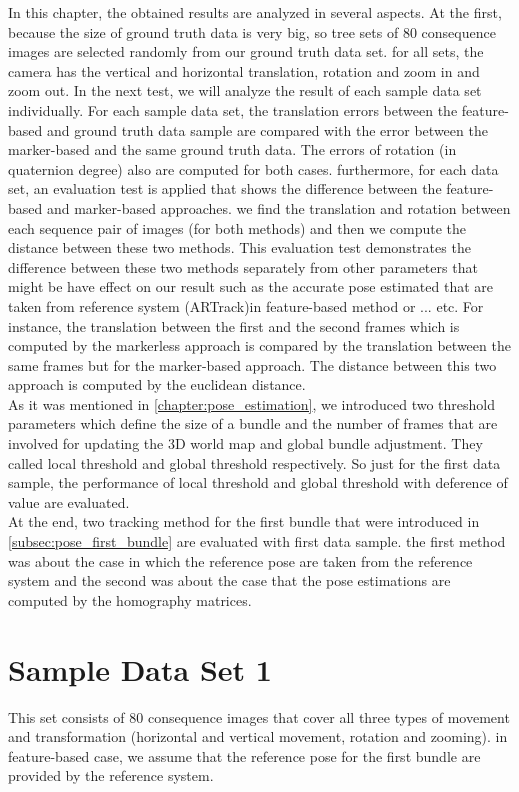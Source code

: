 In this chapter, the obtained results are analyzed in several aspects. At the first, because the size of ground truth data is very big, so tree sets of 80 consequence images are selected randomly from our ground truth data set. for all sets, the camera has the vertical and horizontal translation, rotation and zoom in and zoom out. In the next test, we will analyze the result of each sample data set individually. For each sample data set, the translation errors between the feature-based and ground truth data sample are compared with the error between the marker-based and the same ground truth data. The errors of rotation (in quaternion degree) also are computed for both cases. furthermore, for each data set, an evaluation test is applied that shows the difference between the feature-based and marker-based approaches. we find the translation and rotation between each sequence pair of images (for both methods) and then we compute the distance between these two methods. This evaluation test demonstrates the difference between these two methods separately from other parameters that might be have effect on our result such as the accurate pose estimated that are taken from reference system (ARTrack)in feature-based method or ... etc. For instance, the translation between the first and the second frames which is computed by the markerless approach is compared by the translation between the same frames but for the marker-based approach. The distance between this two approach is computed by the euclidean distance.\\
As it was mentioned in \autoref{chapter:pose_estimation}, we introduced two threshold parameters which define the size of a bundle and the number of frames that are involved for updating the 3D world map and global bundle adjustment. They called local threshold and global threshold respectively. So just for the first data sample, the performance of local threshold and global threshold with deference of value are evaluated.\\
At the end, two tracking method for the first bundle that were introduced in \autoref{subsec:pose_first_bundle} are evaluated with first data sample. the first method was about the case in which the reference pose are taken from the reference system and the second was about the case that the pose estimations are computed by the homography matrices.

\section{Sample Data Set 1} \label{sec:sample_01}
This set consists of 80 consequence images that cover all three types of movement and transformation (horizontal and vertical movement, rotation and zooming). in feature-based case, we assume that the reference pose for the first bundle are provided by the reference system.

